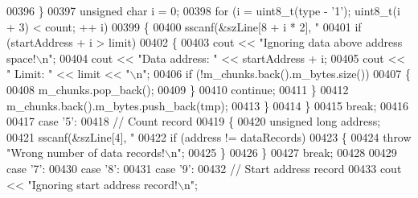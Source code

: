 \begin{DoxyCode}
{{{{{{{{{{{{{{{00396                         \}
00397                         \textcolor{keywordtype}{unsigned} \textcolor{keywordtype}{char} i = 0;
00398                         \textcolor{keywordflow}{for} (i = uint8\_t(type - \textcolor{charliteral}{'1'}); uint8\_t(i + 3) < count; ++
      i)
00399                         \{
00400                             sscanf(&szLine[8 + i * 2], \textcolor{stringliteral}{"%
00401                             \textcolor{keywordflow}{if} (startAddress + i > limit)
00402                             \{
00403                                 cout << \textcolor{stringliteral}{"Ignoring data above address space!\(\backslash\)n"};
00404                                 cout << \textcolor{stringliteral}{"Data address: "} << startAddress + i;
00405                                 cout << \textcolor{stringliteral}{" Limit: "} << limit << \textcolor{stringliteral}{"\(\backslash\)n"};
00406                                 \textcolor{keywordflow}{if} (!m\_chunks.back().m\_bytes.size())
00407                                 \{
00408                                     m\_chunks.pop\_back();
00409                                 \}
00410                                 \textcolor{keywordflow}{continue};
00411                             \}
00412                             m\_chunks.back().m\_bytes.push\_back(tmp);
00413                         \}
00414                     \}
00415                     \textcolor{keywordflow}{break};
00416 
00417                 \textcolor{keywordflow}{case} \textcolor{charliteral}{'5'}:
00418                     \textcolor{comment}{// Count record}
00419                     \{
00420                         \textcolor{keywordtype}{unsigned} \textcolor{keywordtype}{long}   address;
00421                         sscanf(&szLine[4], \textcolor{stringliteral}{"%
00422                         \textcolor{keywordflow}{if} (address != dataRecords)
00423                         \{
00424                             \textcolor{keywordflow}{throw} \textcolor{stringliteral}{"Wrong number of data records!\(\backslash\)n"};
00425                         \}
00426                     \}
00427                     \textcolor{keywordflow}{break};
00428 
00429                 \textcolor{keywordflow}{case} \textcolor{charliteral}{'7'}:
00430                 \textcolor{keywordflow}{case} \textcolor{charliteral}{'8'}:
00431                 \textcolor{keywordflow}{case} \textcolor{charliteral}{'9'}:
00432                     \textcolor{comment}{// Start address record}
00433                     cout << \textcolor{stringliteral}{"Ignoring start address record!\(\backslash\)n"};
}}}}}}}}}}}}}}}}}
\end{DoxyCode}
